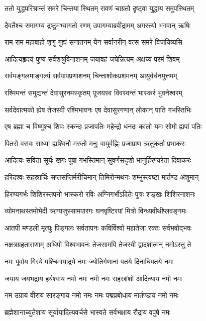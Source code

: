 
\twolineshloka
{ततो युद्धपरिश्रान्तं समरे चिन्तया स्थितम्}
{रावणं चाग्रतो दृष्ट्वा युद्धाय समुपस्थितम्}

\twolineshloka
{दैवतैश्च समागम्य द्रष्टुमभ्यागतो रणम्}
{उपागम्याब्रवीद्रामम् अगस्त्यो भगवान् ऋषिः}

\twolineshloka
{राम राम महाबाहो शृणु गुह्यं सनातनम्}
{येन सर्वानरीन् वत्स समरे विजयिष्यसि}

\twolineshloka
{आदित्यहृदयं पुण्यं सर्वशत्रुविनाशनम्}
{जयावहं जपेन्नित्यम् अक्षय्यं परमं शिवम्}

\twolineshloka
{सर्वमङ्गलमाङ्गल्यं सर्वपापप्रणाशनम्}
{चिन्ताशोकप्रशमनम् आयुर्वर्धनमुत्तमम्}

\twolineshloka
{रश्मिमन्तं समुद्यन्तं देवासुरनमस्कृतम्}
{पूजयस्व विवस्वन्तं भास्करं भुवनेश्वरम्}

\twolineshloka
{सर्वदेवात्मको ह्येष तेजस्वी रश्मिभावनः}
{एष देवासुरगणान् लोकान् पाति गभस्तिभिः}

\twolineshloka
{एष ब्रह्मा च विष्णुश्च शिवः स्कन्दः प्रजापतिः}
{महेन्द्रो धनदः कालो यमः सोमो ह्यपां पतिः}

\twolineshloka
{पितरो वसवः साध्या ह्यश्विनौ मरुतो मनुः}
{वायुर्वह्निः प्रजाप्राण ऋतुकर्ता प्रभाकरः}

\twolineshloka
{आदित्यः सविता सूर्यः खगः पूषा गभस्तिमान्}
{सुवर्णसदृशो भानुर्हिरण्यरेता दिवाकरः}

\twolineshloka
{हरिदश्वः सहस्रार्चिः सप्तसप्तिर्मरीचिमान्}
{तिमिरोन्मथनः शम्भुस्त्वष्टा मार्तण्ड अंशुमान्}

\twolineshloka
{हिरण्यगर्भः शिशिरस्तपनो भास्करो रविः}
{अग्निगर्भोऽदितेः पुत्रः शङ्खः शिशिरनाशनः}

\twolineshloka
{व्योमनाथस्तमोभेदी ऋग्यजुस्सामपारगः}
{घनवृष्टिरपां मित्रो विन्ध्यवीथीप्लवङ्गमः}

\twolineshloka
{आतपी मण्डली मृत्युः पिङ्गलः सर्वतापनः}
{कविर्विश्वो महातेजा रक्तः सर्वभवोद्भवः}

\twolineshloka
{नक्षत्रग्रहताराणाम् अधिपो विश्वभावनः}
{तेजसामपि तेजस्वी द्वादशात्मन् नमोऽस्तु ते}

\twolineshloka
{नमः पूर्वाय गिरये पश्चिमायाद्रये नमः}
{ज्योतिर्गणानां पतये दिनाधिपतये नमः}

\twolineshloka
{जयाय जयभद्राय हर्यश्वाय नमो नमः}
{नमो नमः सहस्रांशो आदित्याय नमो नमः}

\twolineshloka
{नम उग्राय वीराय सारङ्गाय नमो नमः}
{नमः पद्मप्रबोधाय मार्तण्डाय नमो नमः}

\twolineshloka
{ब्रह्मेशानाच्युतेशाय सूर्यायादित्यवर्चसे}
{भास्वते सर्वभक्षाय रौद्राय वपुषे नमः}

